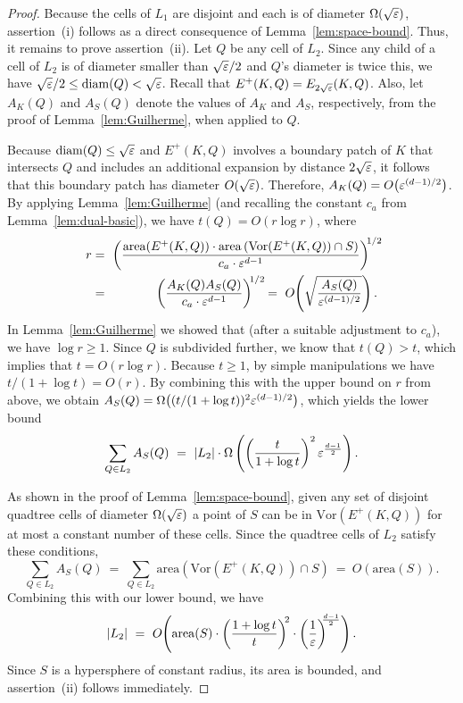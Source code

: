 \documentclass[11pt]{article}   \usepackage[letterpaper,hmargin=2.1cm,vmargin=3cm]{geometry}
\newcommand{\OO}[1]{O\kern-2pt\left(#1\right)}  \newcommand{\half}[1]{\frac{#1}{2}}
\newcommand{\inv}[1]{\frac{1}{#1}}
\newcommand{\diam}{\mathrm{diam}}
\newcommand{\area}{\mathrm{area}}
\newcommand{\Vor}{\mathrm{Vor}}
\begin{document}
\begin{proof}
Because the cells of $L_1$ are disjoint and each is of diameter $\Omega(\sqrt{\varepsilon})$, assertion~(i) follows as a direct consequence of Lemma~\ref{lem:space-bound}. Thus, it remains to prove assertion~(ii). Let $Q$ be any cell of $L_2$. Since any child of a cell of $L_2$ is of diameter smaller than $\sqrt{\varepsilon}/2$ and $Q$'s diameter is twice this, we have $\sqrt{\eps}/2 \le \diam(Q) < \sqrt{\eps}$. Recall that $E^+(K,Q) = E_{2\sqrt{\varepsilon}}(K,Q)$. Also, let $A_K(Q)$ and $A_S(Q)$ denote the values of $A_K$ and $A_S$, respectively, from the proof of Lemma~\ref{lem:Guilherme}, when applied to $Q$. 

Because $\diam(Q) \le \sqrt{\eps}$ and $E^+(K,Q)$ involves a boundary patch of $K$ that intersects $Q$ and includes an additional expansion by distance $2 \sqrt{\varepsilon}$, it follows that this boundary patch has diameter $O(\sqrt{\varepsilon})$. Therefore, $A_K(Q) = O\big(\varepsilon^{(d-1)/2}\big)$. By applying Lemma~\ref{lem:Guilherme} (and recalling the constant $c_a$ from Lemma~\ref{lem:dual-basic}), we have $t(Q) = O(r \log r)$, where
\begin{eqnarray*}
	r 
		& = & \NN\left(\frac{\area(E^+(K,Q)) \cdot \area\left(\Vor(E^+(K,Q)) \cap S\right)}{c_a \cdot \eps^{d-1}} \right)^{\N 1/2} \NN \\
		& = & \left( \frac{A_K(Q) A_S(Q)}{c_a \cdot \eps^{d-1}}\right)^{\N 1/2} \NN
		~ = ~ \OO{ \sqrt{\frac{A_S(Q)}{\eps^{(d-1)/2}}} }.
\end{eqnarray*}
In Lemma~\ref{lem:Guilherme} we showed that (after a suitable adjustment to $c_a$), we have $\log r \ge 1$. Since $Q$ is subdivided further, we know that $t(Q) > t$, which implies that $t = O(r \log r)$. Because $t \ge 1$, by simple manipulations we have $t/(1 + \log t) = O(r)$. By combining this with the upper bound on $r$ from above, we obtain $A_S(Q) = \Omega\big( (t/(1 + \log t))^{2} \varepsilon^{(d-1)/2}\big)$, which yields the lower bound
\[
	\sum_{Q \in L_2} A_S(Q)
		~  =  ~ |L_2| \cdot \Omega\left( \left( \frac{t}{1 + \log t} \right)^{2} \varepsilon^{\frac{d-1}{2}}\right).
\]

As shown in the proof of Lemma~\ref{lem:space-bound}, given any set of disjoint quadtree cells of diameter $\Omega(\sqrt{\varepsilon})$ a point of $S$ can be in $\Vor(E^+(K,Q))$ for at most a constant number of these cells. Since the quadtree cells of $L_2$ satisfy these conditions,
\[
	\sum_{Q \in L_2} A_S(Q)
		~  =  ~ \sum_{Q \in L_2} \area(\Vor(E^+(K,Q)) \cap S)
		~  =  ~ O(\area(S)).
\]
Combining this with our lower bound, we have
\[
	|L_2|
		~  =  ~ \OO{ \area(S) \cdot \left(\frac{1 + \log t}{t}\right)^{\N 2} \cdot \left( \inv{\eps} \right)^{\NN \frac{d-1}{2}} }.
\]
Since $S$ is a hypersphere of constant radius, its area is bounded, and assertion~(ii) follows immediately.
\end{proof}
\end{document}
